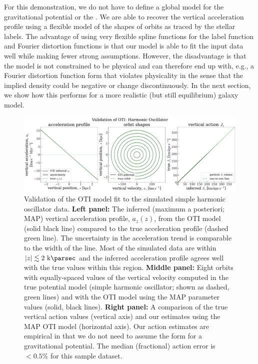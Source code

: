 \documentclass[modern]{aastex631}
\begin{document}
For this demonstration, we do not have to define a global model for the gravitational
potential or the \df.
We are able to recover the vertical acceleration profile using a flexible model of the
shapes of orbits as traced by the stellar labels.
The advantage of using very flexible spline functions for the label function and Fourier
distortion functions is that our model is able to fit the input data well while making
fewer strong assumptions.
However, the disadvantage is that the model is not constrained to be physical and can
therefore end up with, e.g., a Fourier distortion function form that violates
physicality in the sense that the implied density could be negative or change
discontinuously.
In the next section, we show how this performs for a more realistic (but still
equilibrium) galaxy model.

\begin{figure}[t!]
\begin{center}
\includegraphics[width=\textwidth]{sho-validation.pdf}
\end{center}
\caption{%
Validation of the OTI model fit to the simulated simple harmonic oscillator data.
\textbf{Left panel:} The inferred (maximum a posteriori; MAP) vertical acceleration
profile, $a_z(z)$, from the OTI model (solid black line) compared to the true
acceleration profile (dashed green line).
The uncertainty in the acceleration trend is comparable to the width of the line.
Most of the simulated data are within $|z| \lesssim 2~\kpc$ and the inferred
acceleration profile agrees well with the true values within this region.
\textbf{Middle panel:} Eight orbits with equally-spaced values of the vertical velocity
computed in the true potential model (simple harmonic oscillator; shown as dashed, green
lines) and with the OTI model using the MAP parameter values (solid, black lines).
\textbf{Right panel:} A comparison of the true vertical action values (vertical axis)
and our estimates using the MAP OTI model (horizontal axis).
Our action estimates are empirical in that we do not need to assume the form for a
gravitational potential.
The median (fractional) action error is $<0.5\%$ for this sample dataset.
\label{fig:sho-validation}
}
\end{figure}
\end{document}
